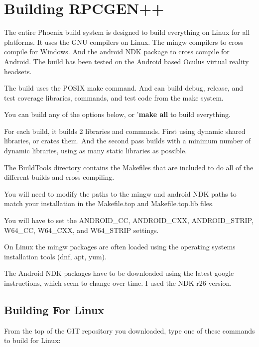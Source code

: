 \section{Building RPCGEN++}
The entire Phoenix build system is designed to build everything
on Linux for all platforms.
It uses the GNU compilers on Linux.
The mingw compilers to cross compile for Windows.
And the android NDK package to cross compile for Android.
The build has been tested on the Android based Oculus virtual
reality headsets.

The build uses the POSIX make command.
And can build debug, release, and test coverage libraries,
commands, and test code from the make system.

You can build any of the options below, or '\textbf{make all}
to build everything.

For each build, it builds 2 libraries and commands.
First using dynamic shared libraries, or crates them.
And the second pass builds with a minimum number
of dynamic libraries, using as many static libraries
as possible.

The BuildTools directory contains the Makefiles
that are included to do all of the different builds
and cross compiling.

You will need to modify the paths to the mingw and
android NDK paths to match your installation in the
Makefile.top and Makefile.top.lib files.

You will have to set the ANDROID\_CC, ANDROID\_CXX, ANDROID\_STRIP,
W64\_CC, W64\_CXX, and W64\_STRIP settings.

On Linux the mingw packages are often loaded using the operating
systems installation tools (dnf, apt, yum).

The Android NDK packages have to be downloaded using the
latest google instructions, which seem to change over time.
I used the NDK r26 version.

\subsection{Building For Linux}
From the top of the GIT repository you downloaded,
type one of these commands to build for Linux:

